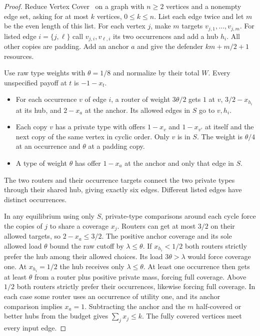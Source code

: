 \documentclass[11pt,oneside,openany,notitlepage]{report}
\begin{document}
\begin{proof}
Reduce Vertex Cover~\cite{karp} on a graph with \(n\ge2\) vertices and a
nonempty edge set, asking for at most \(k\) vertices, \(0\le k\le n\).
List each edge twice and let \(m\) be the even length of this list.
For each vertex \(j\), make \(m\) targets \(v_{j,1},\ldots,v_{j,m}\).
For listed edge \(i=\{j,\ell\}\) call \(v_{j,i},v_{\ell,i}\) its two
occurrences and add a hub \(h_i\). All other copies are padding. Add
an anchor \(a\) and give the defender \(km+m/2+1\) resources.

Use raw type weights with \(\theta=1/8\) and normalize by their total
\(W\). Every unspecified payoff at \(t\) is \(-1-x_t\).
\begin{itemize}
\item For each occurrence \(v\) of edge \(i\), a router of weight
\(3\theta/2\) gets \(1\) at \(v\), \(3/2-x_{h_i}\) at its hub, and
\(2-x_a\) at the anchor. Its allowed edges in \(S\) go to \(v,h_i\).
\item Each copy \(v\) has a private type with offers \(1-x_v\) and
\(1-x_{v'}\) at itself and the next copy of the same vertex in cyclic
order. Only \(v\) is in \(S\). The weight is \(\theta/4\) at an
occurrence and \(\theta\) at a padding copy.
\item A type of weight \(\theta\) has offer \(1-x_a\) at the anchor
and only that edge in \(S\).
\end{itemize}
The two routers and their occurrence targets connect the two private
types through their shared hub, giving exactly six edges. Different
listed edges have distinct occurrences.

In any equilibrium using only \(S\), private-type comparisons around
each cycle force the copies of \(j\) to share a coverage \(x_j\).
Routers can get at most \(3/2\) on their allowed targets, so
\(2-x_a\le3/2\). The positive anchor coverage and its sole allowed load
\(\theta\) bound the raw cutoff by \(\lambda\le\theta\).
If \(x_{h_i}<1/2\) both routers strictly prefer the hub among their
allowed choices. Its load \(3\theta>\lambda\) would force coverage one.
At \(x_{h_i}=1/2\) the hub receives only \(\lambda\le\theta\). At least
one occurrence then gets at least \(\theta\) from a router plus positive
private mass, forcing full coverage. Above \(1/2\) both routers strictly
prefer their occurrences, likewise forcing full coverage. In each case
some router uses an occurrence of utility one, and its anchor comparison
implies \(x_a=1\). Subtracting the anchor and the \(m\) half-covered or
better hubs from the budget gives \(\sum_jx_j\le k\).
The fully covered vertices meet every input edge.


\end{proof}
\end{document}
